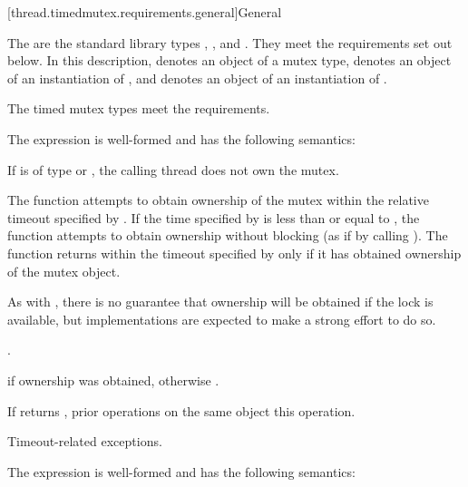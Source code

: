 [thread.timedmutex.requirements.general]{General}

\pnum
The  are the standard library types ,
, and . They
meet the requirements set out below.
In this description,  denotes an object of a mutex type,
 denotes an object of an
instantiation of , and  denotes an
object of an
instantiation of .
\begin{note}
The timed mutex types meet the 
requirements.
\end{note}

\pnum
The expression  is well-formed
and has the following semantics:

\begin{itemdescr}
\pnum
\expects
If  is of type  or
, the calling thread does not
own the mutex.

\pnum
\effects
The function attempts to obtain ownership of the mutex within the
relative timeout
specified by . If the time specified by  is less than or
equal to , the function attempts to obtain ownership without blocking (as if by calling
). The function returns within the timeout specified by
 only if it has obtained ownership of the mutex object.
\begin{note}
As
with , there is no guarantee that ownership will be obtained if the
lock is available, but implementations are expected to make a strong effort to do so.
\end{note}

\pnum
\returntype {}.

\pnum
\returns
{} if ownership was obtained, otherwise .

\pnum
\sync
If  returns , prior  operations
on the same object  this operation.

\pnum
\throws
Timeout-related exceptions.
\end{itemdescr}

\pnum
The expression  is well-formed
and has the following semantics:

